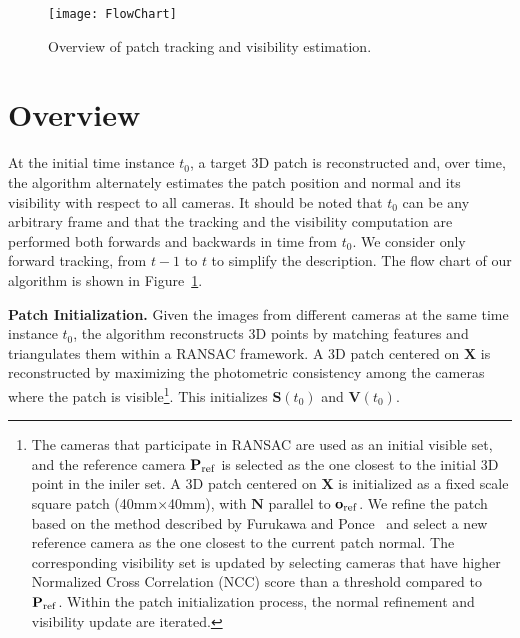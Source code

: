 \documentclass[10pt,twocolumn,letterpaper]{article}
\begin{document}
\begin{figure}[t]
\texttt{[image: FlowChart]}
\caption{Overview of patch tracking and visibility estimation.}
\label{fig:overview}
\end{figure}

\section{Overview}
At the initial time instance $t_0$, a target 3D patch is reconstructed and, over time, the algorithm alternately estimates the patch position and normal and its visibility with respect to all cameras. It should be noted that $t_0$ can be any arbitrary frame and that the tracking and the visibility computation are performed both forwards and backwards in time from $t_0$. We consider only forward tracking, from $t-1$ to $t$ to simplify the description. The flow chart of our algorithm is shown in Figure~\ref{fig:overview}.

\noindent \textbf{Patch Initialization.} Given the images from different cameras at the same time instance $t_0$, the algorithm reconstructs 3D points by matching features and triangulates them within a RANSAC framework. A 3D patch centered on $\mathbf{X}$ is reconstructed by maximizing the photometric consistency among the cameras where the patch is visible\footnote{The cameras that participate in RANSAC are used as an initial visible set, and the reference camera $\mathbf{P}_{\rm{ref}}$ is selected as the one closest to the initial 3D point in the iniler set. A 3D patch centered on $\mathbf{X}$ is initialized as a fixed scale square patch (40mm$\times$40mm), with $\mathbf{N}$ parallel to $\mathbf{o}_{\rm ref}$. We refine the patch based on the method described by Furukawa and Ponce~\cite{Furukawa2010} and select a new reference camera as the one closest to the current patch normal. The corresponding visibility set is updated by selecting cameras that have higher Normalized Cross Correlation (NCC) score than a threshold compared to $\mathbf{P}_{\rm{ref}}$. Within the patch initialization process, the normal refinement and visibility update are iterated.}. This initializes $\mathbf{S}(t_0)$ and $\mathbf{V}(t_0)$.
\end{document}
